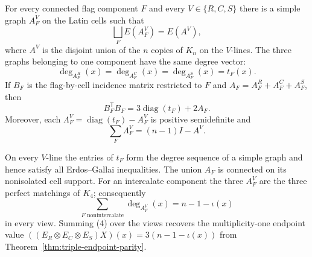 \begin{theorem}
\label{thm:component-cell-edge-partition}
For every connected flag component $F$ and every
$V\in\{R,C,S\}$ there is a simple graph $A_F^V$ on the Latin cells such
that
\[
 \bigsqcup_F E(A_F^V)=E(A^V),
\]
where $A^V$ is the disjoint union of the $n$ copies of $K_n$ on the
$V$-lines.  The three graphs belonging to one component have the same degree
vector:
\[
 \deg_{A_F^R}(x)=\deg_{A_F^C}(x)=\deg_{A_F^S}(x)=t_F(x).
 \tag{1}
\]
If $B_F$ is the flag-by-cell incidence matrix restricted to $F$ and
$A_F=A_F^R+A_F^C+A_F^S$, then
\[
 B_F^{\mathsf T}B_F=3\operatorname{diag}(t_F)+2A_F. \tag{2}
\]
Moreover, each
$\Lambda_F^V=\operatorname{diag}(t_F)-A_F^V$ is positive semidefinite and
\[
 \sum_F\Lambda_F^V=(n-1)I-A^V. \tag{3}
\]

On every $V$-line the entries of $t_F$ form the degree sequence of a simple
graph and hence satisfy all Erdos--Gallai inequalities.  The union $A_F$ is
connected on its nonisolated cell support.  For an intercalate component the
three $A_F^V$ are the three perfect matchings of $K_4$; consequently
\[
 \sum_{F\text{ nonintercalate}}\deg_{A_F^V}(x)=n-1-\iota(x) \tag{4}
\]
in every view.  Summing (4) over the views recovers the multiplicity-one
endpoint value
$((E_R\otimes E_C\otimes E_S)X)(x)=3(n-1-\iota(x))$ from
Theorem~\ref{thm:triple-endpoint-parity}.
\end{theorem}

